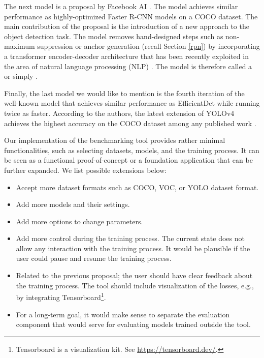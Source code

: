 The next model is a proposal by Facebook AI \cite{detr}. The model achieves similar
performance as highly-optimized Faster R-CNN models on a COCO dataset. The main
contribution of the proposal is the introduction of a new approach to the object
detection task. The model removes hand-designed steps such as non-maximum
suppression or anchor generation (recall Section \ref{rpn}) by incorporating a
transformer encoder-decoder architecture \cite{transformer} that has been
recently exploited in the area of natural language processing (NLP)
\cite{bert, gpt3}. The model is therefore called a  or
simply .

Finally, the last model we would like to mention is the fourth iteration of the
well-known  model \cite{yolo1, yolo2, yolo3, yolo4} that achieves similar
performance as EfficientDet while running twice as faster. According to the
authors, the latest extension of YOLOv4 achieves the highest accuracy on the
COCO dataset among any published work \cite{yolo4scaled}.

Our implementation of the benchmarking tool provides rather minimal
functionalities, such as selecting datasets, models, and the training process.
It can be seen as a functional proof-of-concept or a foundation application that
can be further expanded. We list possible extensions below:
\begin{itemize}
      \item Accept more dataset formats such as COCO, VOC, or YOLO dataset format.
      \item Add more models and their settings.
      \item Add more options to change parameters.
      \item Add more control during the training process. The current state does
            not allow any interaction with the training process. It would be
            plausible if the user could pause and resume the training process.
      \item Related to the previous proposal; the user should have clear feedback
            about the training process. The tool should include visualization of
            the losses, e.g., by integrating Tensorboard\footnote{
                  Tensorboard is a visualization kit. See
                  \url{https://tensorboard.dev/}.
            }.
      \item For a long-term goal, it would make sense to separate the evaluation
            component that would serve for evaluating models trained outside the
            tool.
\end{itemize}